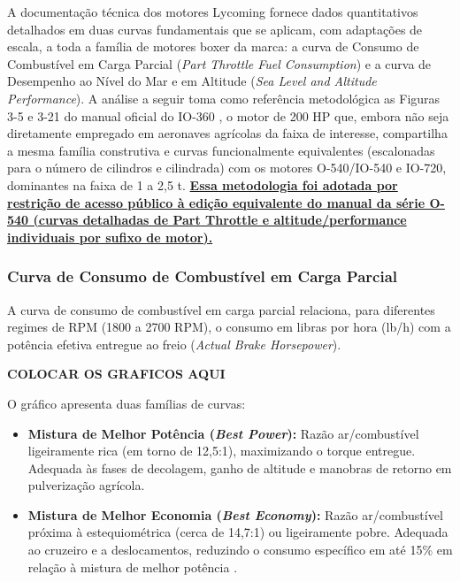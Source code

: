 \documentclass[a4paper,12pt]{article}
\newcommand{\autoeval}[1]{\textbf{\underline{#1}}}
\begin{document}
A documentação técnica dos motores Lycoming fornece dados quantitativos detalhados em duas curvas fundamentais que se aplicam, com adaptações de escala, a toda a família de motores boxer da marca: a curva de Consumo de Combustível em Carga Parcial (\textit{Part Throttle Fuel Consumption}) e a curva de Desempenho ao Nível do Mar e em Altitude (\textit{Sea Level and Altitude Performance}). A análise a seguir toma como referência metodológica as Figuras 3-5 e 3-21 do manual oficial do IO-360 \cite{io360manual}, o motor de 200 HP que, embora não seja diretamente empregado em aeronaves agrícolas da faixa de interesse, compartilha a mesma família construtiva e curvas funcionalmente equivalentes (escalonadas para o número de cilindros e cilindrada) com os motores O-540/IO-540 e IO-720, dominantes na faixa de 1 a 2{,}5 t. \autoeval{Essa metodologia foi adotada por restrição de acesso público à edição equivalente do manual da série O-540 (curvas detalhadas de Part Throttle e altitude/performance individuais por sufixo de motor).}

\subsubsection{Curva de Consumo de Combustível em Carga Parcial}

A curva de consumo de combustível em carga parcial relaciona, para diferentes regimes de RPM (1800 a 2700 RPM), o consumo em libras por hora (lb/h) com a potência efetiva entregue ao freio (\textit{Actual Brake Horsepower}). 

\textbf{COLOCAR OS GRAFICOS AQUI}

O gráfico apresenta duas famílias de curvas:

\begin{itemize}
    \item \textbf{Mistura de Melhor Potência (\textit{Best Power}):} Razão ar/combustível ligeiramente rica (em torno de 12{,}5:1), maximizando o torque entregue. Adequada às fases de decolagem, ganho de altitude e manobras de retorno em pulverização agrícola.
    \item \textbf{Mistura de Melhor Economia (\textit{Best Economy}):} Razão ar/combustível próxima à estequiométrica (cerca de 14{,}7:1) ou ligeiramente pobre. Adequada ao cruzeiro e a deslocamentos, reduzindo o consumo específico em até 15\% em relação à mistura de melhor potência \cite{io360manual}. %
\end{itemize}
\end{document}
